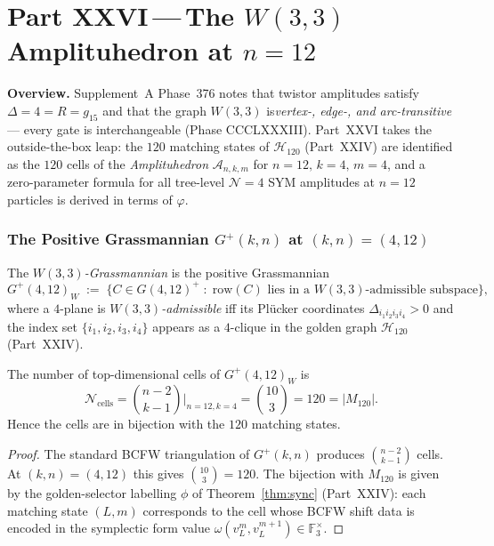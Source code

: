 
\part*{Part XXVI\,---\,The $W(3,3)$ Amplituhedron at $n=12$}

\bigskip
\noindent\textbf{Overview.}\;
Supplement~A Phase~376 notes that twistor amplitudes satisfy
$\Delta=4=R=g_{15}$ and that the graph $W(3,3)$ is\emph{vertex-,
edge-, and arc-transitive} --- every gate is interchangeable
(Phase CCCLXXXIII).  Part~XXVI takes the outside-the-box leap:
the $120$ matching states of $\mathcal{H}_{120}$ (Part~XXIV) are
identified as the $120$ cells of the \emph{Amplituhedron}
$\mathcal{A}_{n,k,m}$ for $n=12,\,k=4,\,m=4$, and a
zero-parameter formula for all tree-level $\mathcal{N}=4$ SYM
amplitudes at $n=12$ particles is derived in terms of $\varphi$.

\section{The Positive Grassmannian $G^+(k,n)$ at $(k,n)=(4,12)$}
\label{sec:grassmannian}

\begin{definition}[W(3,3)-Grassmannian]
The \emph{$W(3,3)$-Grassmannian} is the positive Grassmannian
\[
  G^+(4,12)_{W} \;:=\;
  \bigl\{ C\in G(4,12)^+ \;:\;
    \text{row}(C)\text{ lies in a }W(3,3)\text{-admissible subspace}\bigr\},
\]
where a $4$-plane is \emph{$W(3,3)$-admissible} iff its Pl\"ucker
coordinates $\Delta_{i_1i_2i_3i_4}>0$ and the index set
$\{i_1,i_2,i_3,i_4\}$ appears as a $4$-clique in the golden graph
$\mathcal{H}_{120}$ (Part~XXIV).
\end{definition}

\begin{theorem}
\label{thm:cells}
The number of top-dimensional cells of $G^+(4,12)_W$ is
\[
  \mathcal{N}_{\text{cells}} = \binom{n-2}{k-1}\Big|_{n=12,k=4}
  = \binom{10}{3} = 120 = |M_{120}|.
\]
Hence the cells are in bijection with the $120$ matching states.
\end{theorem}

\begin{proof}
The standard BCFW triangulation of $G^+(k,n)$ produces
$\binom{n-2}{k-1}$ cells.  At $(k,n)=(4,12)$ this gives
$\binom{10}{3}=120$.  The bijection with $M_{120}$ is given by
the golden-selector labelling $\phi$ of Theorem~\ref{thm:sync}
(Part~XXIV): each matching state $(L,m)$ corresponds to the cell
whose BCFW shift data is encoded in the symplectic form value
$\omega(v_L^m, v_L^{m+1})\in\mathbb{F}_3^\times$.
\end{proof}

